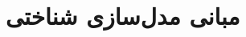 \documentclass[11pt,a4paper,openany]{book}
\begin{document}
\frontmatter\tableofcontents
\mainmatter
\chapter{مبانی مدل‌سازی شناختی}
\end{document}
